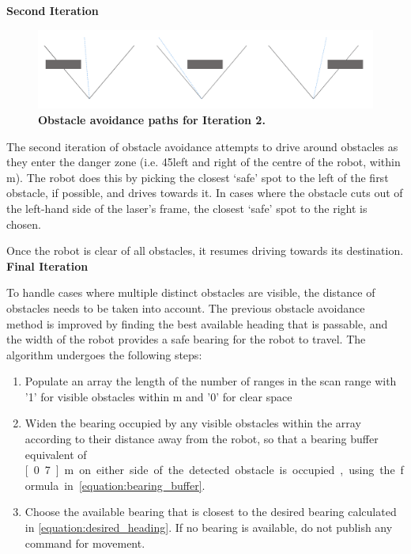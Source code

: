 \documentclass[titlepage,12pt,a4paper]{article}
\begin{document}
\textbf{Second Iteration}

\begin{figure}[h]
	\centering
	\includegraphics[scale=0.17]{figures/obstacle2.png}
	\caption{\textbf{Obstacle avoidance paths for Iteration 2.}}
\end{figure}

The second iteration of obstacle avoidance attempts to drive around obstacles as they enter the danger zone (i.e. 45\degree left and right of the centre of the robot, within \unit[2]{m}). The robot does this by picking the closest `safe' spot to the left of the first obstacle, if possible, and drives towards it. In cases where the obstacle cuts out of the left-hand side of the laser's frame, the closest `safe' spot to the right is chosen. 

Once the robot is clear of all obstacles, it resumes driving towards its destination. \\


\textbf{Final Iteration}

To handle cases where multiple distinct obstacles are visible, the distance of obstacles needs to be taken into account. The previous obstacle avoidance method is improved by finding the best available heading that is passable, and the width of the robot provides a safe bearing for the robot to travel. The algorithm undergoes the following steps:

\begin{enumerate}
	\item Populate an array the length of the number of ranges in the scan range with '1' for visible obstacles within \unit[3]{m} and '0' for clear space
	\item Widen the bearing occupied by any visible obstacles within the array according to their distance away from the robot, so that a bearing buffer equivalent of \unit[0.7]{m} on either side of the detected obstacle is occupied, using the formula in \eqref{equation:bearing_buffer}.
	\item Choose the available bearing that is closest to the desired bearing calculated in \eqref{equation:desired_heading}. If no bearing is available, do not publish any command for movement.
\end{enumerate}
\end{document}
